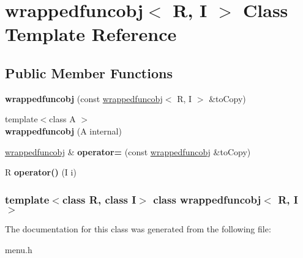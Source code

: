 \hypertarget{classwrappedfuncobj}{\section{wrappedfuncobj$<$ R, I $>$ Class Template Reference}
\label{classwrappedfuncobj}
}
\subsection*{Public Member Functions}
\begin{DoxyCompactItemize}
\item 
\hypertarget{classwrappedfuncobj_a68469ec527666fb4d485dd88f9217267}{{\bfseries wrappedfuncobj} (const \hyperlink{classwrappedfuncobj}{wrappedfuncobj}$<$ R, I $>$ \&to\-Copy)}\label{classwrappedfuncobj_a68469ec527666fb4d485dd88f9217267}

\item 
\hypertarget{classwrappedfuncobj_ac338e00331090276dca1d79615e42e33}{{\footnotesize template$<$class A $>$ }\\{\bfseries wrappedfuncobj} (A internal)}\label{classwrappedfuncobj_ac338e00331090276dca1d79615e42e33}

\item 
\hypertarget{classwrappedfuncobj_ac15f4caae45532d2ed29b48de235cf56}{\hyperlink{classwrappedfuncobj}{wrappedfuncobj} \& {\bfseries operator=} (const \hyperlink{classwrappedfuncobj}{wrappedfuncobj} \&to\-Copy)}\label{classwrappedfuncobj_ac15f4caae45532d2ed29b48de235cf56}

\item 
\hypertarget{classwrappedfuncobj_a26203fd381708305368d50300b95b77b}{R {\bfseries operator()} (I i)}\label{classwrappedfuncobj_a26203fd381708305368d50300b95b77b}

\end{DoxyCompactItemize}
\subsubsection*{template$<$class R, class I$>$ class wrappedfuncobj$<$ R, I $>$}



The documentation for this class was generated from the following file\-:\begin{DoxyCompactItemize}
\item 
menu.\-h\end{DoxyCompactItemize}
